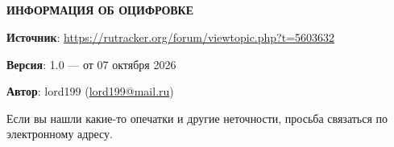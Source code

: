 \documentclass[12pt, a4paper, openany]{book}
\begin{document}
\thispagestyle{empty} %



\newpage



\setcounter{secnumdepth}{0}






\ \\
\ \\
\ \\
\ \\



\hangindent=2cm  \textbf{ИНФОРМАЦИЯ ОБ ОЦИФРОВКЕ}



\hangindent=2cm  \textbf{Источник}: \href{https://rutracker.org/forum/viewtopic.php?t=5603632}{https://rutracker.org/forum/viewtopic.php?t=5603632}


\hangindent=2cm  \textbf{Версия}: 1.0 — от 07 октября 2026


\hangindent=2cm  \textbf{Автор}: lord199 (\href{mailto: lord199@mail.ru}{lord199@mail.ru})


\hangindent=2cm  Если вы нашли какие-то опечатки и другие неточности, просьба связаться по электронному адресу.









\thispagestyle{empty} %
\end{document}
